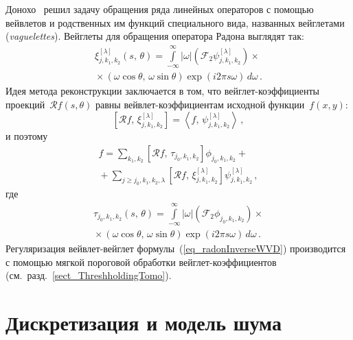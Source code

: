 \begin{multicols}{2}
Донохо~\cite{DonohoWVD} решил задачу обращения ряда линейных операторов 
с помощью вейвлетов и родственных им функций специального вида, названных вейглетами (\textit{vaguelettes}). 
Вейглеты для обращения оператора Радона выглядят так:
\begin{multline*}
\xi^{[\lambda]}_{j,k_1,k_2}(s,\,\theta)=
\int\limits_{-\infty}^\infty|\omega|\left(\mathcal{F}_2\psi^{[\lambda]}_{j,k_1,k_2}\right)\times{}\\
{}\times \left( \omega\cos\theta,\,\omega\sin\theta \right)\exp(i2\pi s\omega)\,d\omega\,.
\end{multline*}
Идея метода реконструкции заключается в том, что вейглет-коэффициенты проекций~$\mathcal{R}f(s,\theta)$ 
равны вейвлет-коэффициентам исходной функции~$f(x,y)$:
\begin{equation*}
\left[\mathcal{R}f,\,\xi^{[\lambda]}_{j,k_1,k_2}\right] = \left\langle f,\,\psi^{[\lambda]}_{j,k_1,k_2}\right\rangle\,,
\end{equation*}
и поэтому
\begin{multline}
f = \sum\limits_{k_1,k_2}\left[\mathcal{R}f,\,\tau_{j_0,k_1,k_2}\right] \phi_{j_0,k_1,k_2} +{}\\
{}+ \sum\limits_{j\geqslant j_0,k_1,k_2,\lambda} \left[\mathcal{R}f,\,\xi^{[\lambda]}_{j,k_1,k_2}\right] \psi^{[\lambda]}_{j,k_1,k_2}\,,
\label{eq_radonInverseWVD}
\end{multline}
где
\begin{multline*}
\tau_{j_0,k_1,k_2}(s,\,\theta)=\int\limits_{-\infty}^\infty|\omega|\left(\mathcal{F}_2\phi_{j_0,k_1,k_2}\right)\times{}\\
{}\times \left( \omega\cos\theta,\,\omega\sin\theta \right)
\exp\left(i2\pi s\omega\right)\,d\omega\,.
\end{multline*}
Регуляризация вейвлет-вейглет формулы~(\ref{eq_radonInverseWVD}) производится с 
помощью мягкой пороговой обработки вейглет-коэффициентов (см.\ разд.~\ref{sect_ThreshholdingTomo}).

\section{Дискретизация и модель шума}


\end{multicols}
